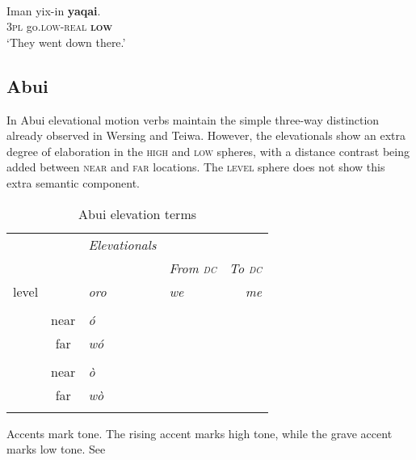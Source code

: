  

   

 



\ea%
\label{ex:7:8}
 \\
\gll Iman     yix-in \textbf{yaqai}. \\
       \textsc{3pl} go.\textsc{low}{}-\textsc{real} \textbf{\textsc{low}} \\
\glt  `They went down there.'
\z

 

 



\subsection{Abui}
In Abui elevational motion verbs maintain the simple three-way distinction already observed in Wersing and Teiwa. However, the elevationals show an extra degree of elaboration in the \textsc{high} and \textsc{low} spheres, with a distance contrast being added between \textsc{near} and \textsc{far} locations. The \textsc{level} sphere does not show this extra semantic component.



\begin{table}
\caption{Abui elevation terms}
\label{tab:7:abui}
\begin{tabularx}{\textwidth}{>{\sc}l>{\sc}S>{\it}X>{\it}X>{\it}r}
\lsptoprule
& 		& \rm Elevationals 		& \\ 
		& 		&              		& \rm From \textsc{dc} & \rm To \textsc{dc}\\
\midrule
{level}	&  		& {oro}			& we 		& me \\
\\
	& {near}& \textit{\'o} {\rm\dag} 	&  	& \\
		& {far} & {w\'o} 		&        	& 			\\
\\
  	& {near}& ò 		& 		&         \\
		& {far} & {w\`o} 		&  		&				\\
\lspbottomrule
\end{tabularx}

{\dag} Accents mark tone. The rising accent marks high tone, while the grave accent marks low tone. See \citet[60]{Kratochvil2007}
\end{table}

